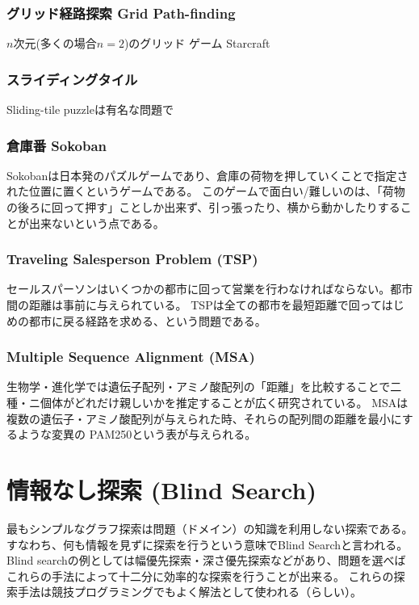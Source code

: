 \documentclass{book}
\begin{document}
\subsection{グリッド経路探索 Grid Path-finding}
$n$次元(多くの場合$n=2$)のグリッド
ゲーム
Starcraft


\subsection{スライディングタイル}

Sliding-tile puzzleは有名な問題で


\subsection{倉庫番 Sokoban}
Sokobanは日本発のパズルゲームであり、倉庫の荷物を押していくことで指定された位置に置くというゲームである。
このゲームで面白い/難しいのは、「荷物の後ろに回って押す」ことしか出来ず、引っ張ったり、横から動かしたりすることが出来ないという点である。

\subsection{Traveling Salesperson Problem (TSP)}

セールスパーソンはいくつかの都市に回って営業を行わなければならない。都市間の距離は事前に与えられている。
TSPは全ての都市を最短距離で回ってはじめの都市に戻る経路を求める、という問題である。

\subsection{Multiple Sequence Alignment (MSA)}

生物学・進化学では遺伝子配列・アミノ酸配列の「距離」を比較することで二種・ニ個体がどれだけ親しいかを推定することが広く研究されている。
MSAは複数の遺伝子・アミノ酸配列が与えられた時、それらの配列間の距離を最小にするような変異の
PAM250という表が与えられる。



\chapter{情報なし探索 (Blind Search)}
\label{ch:blind-search}
最もシンプルなグラフ探索は問題（ドメイン）の知識を利用しない探索である。
すなわち、何も情報を見ずに探索を行うという意味でBlind Searchと言われる。
Blind searchの例としては幅優先探索・深さ優先探索などがあり、問題を選べばこれらの手法によって十二分に効率的な探索を行うことが出来る。
これらの探索手法は競技プログラミングでもよく解法として使われる（らしい）。
\end{document}
